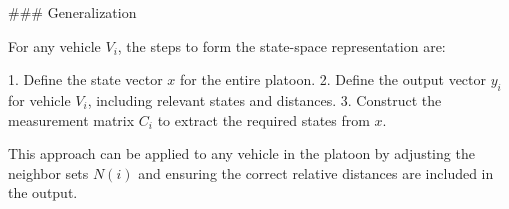 \documentclass[letterpaper, 10pt, conference]{ieeeconf}  %
\begin{document}
### Generalization

For any vehicle \( V_i \), the steps to form the state-space representation are:

1. Define the state vector \( x \) for the entire platoon.
2. Define the output vector \( y_i \) for vehicle \( V_i \), including relevant states and distances.
3. Construct the measurement matrix \( C_i \) to extract the required states from \( x \).

This approach can be applied to any vehicle in the platoon by adjusting the neighbor sets \( N(i) \) and ensuring the correct relative distances are included in the output.







\end{document}
